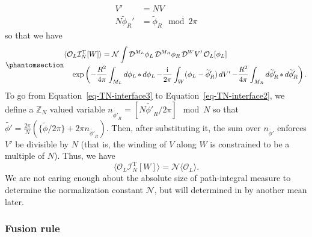 \documentclass[11pt,toc=bibliography]{scrbook}
\DeclareMathOperator{\imunit}{i}
\numberwithin{equation}{section}
\DeclareMathOperator{\imunit}{i}
\begin{document}
\[
\begin{aligned}
V' &= NV \\
N \widetilde\phi_R' &= \widetilde\phi_R \mod 2\pi
\end{aligned}
\] so that we have
\begin{equation}\phantomsection\label{eq-TN-interface3}{
\begin{multlined}
\langle\mathcal{O}_L \mathcal{I}^\text{T}_N[W] \rangle = \mathcal{N} 
\int \mathop{\mathcal{D}^{M_L}\phi_L}\mathop{\mathcal{D}^{M_R}\phi_R}\mathop{\mathcal{D}^{W}V'}
\mathcal{O}_L[\phi_L]\\
\exp\left(-\frac{R^2}{4\pi}\int_{M_L}\mathop{d\phi_L}*\mathop{d\phi_L}
-\frac{\imunit }{2\pi}\int_W ( \phi_L - \widetilde{\phi}_R')\mathop{dV'}
-\frac{R^2}{4\pi}\int_{M_R}\mathop{d\widetilde\phi_R'}*\mathop{d\widetilde\phi_R'}\right).
\end{multlined}
}\end{equation} To go from Equation~\ref{eq-TN-interface3} to
Equation~\ref{eq-TN-interface2}, we define a \(\mathbb{Z}_N\) valued
variable
\(n_{\widetilde{\phi'}_R} = [N\widetilde{\phi'}_R/2\pi] \mod N\) so that
\(\widetilde{\phi'} = \frac{2\pi}{N}(\{\widetilde{\phi}/2\pi\} + 2\pi n_{\widetilde{\phi'}_R})\).
Then, after substituting it, the sum over \(n_{\widetilde{\phi'}}\)
enforces \(V'\) be divisible by \(N\) (that is, the winding of \(V\)
along \(W\) is constrained to be a multiple of \(N\)). Thus, we have
\[\langle\mathcal{O}_L \mathcal{I}_N^\text{T}[W]\rangle = \mathcal{N} \langle \mathcal{O}_L \rangle.
\] We are not caring enough about the absolute size of path-integral
measure to determine the normalization constant \(\mathcal{N}\), but
will determined in by another mean later.

\subsubsection{Fusion rule}\label{fusion-rule}
\end{document}
